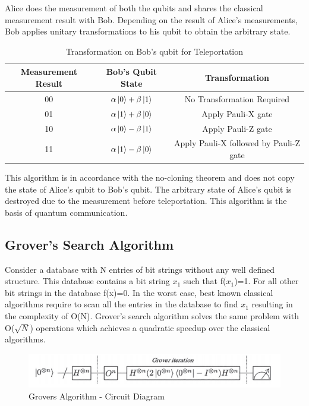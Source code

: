 \documentclass[english,a4paper,11pt,oneside,onecolumn]{book}
\begin{document}
Alice does the measurement of both the qubits and shares the classical measurement result with Bob. Depending on the result of Alice's measurements, Bob applies unitary transformations to his qubit to obtain the arbitrary state.

\begin{table}[!h]
\begin{center}
\begin{tabular}{|c|c|c|}
\hline
\textbf{Measurement Result} & \textbf{Bob's Qubit State} & \textbf{Transformation} \\
\hline
00 & \(\alpha\ket{0}+\beta\ket{1}\) & No Transformation Required\\
\hline
01 & \(\alpha\ket{1}+\beta\ket{0}\) & Apply Pauli-X gate \\
\hline
10 & \(\alpha\ket{0}-\beta\ket{1}\) & Apply Pauli-Z gate \\
\hline
11 & \(\alpha\ket{1}-\beta\ket{0}\) & Apply Pauli-X followed by Pauli-Z gate\\
\hline
\end{tabular}
\end{center}
\caption{Transformation on Bob's qubit for Teleportation} 
\label{tab:qTelePort}
\end{table}

This algorithm is in accordance with the no-cloning theorem and does not copy the state of Alice's qubit to Bob's qubit. The arbitrary state of Alice's qubit is destroyed due to the measurement before teleportation. This algorithm is the basis of quantum communication.

\subsection{Grover's Search Algorithm}
\label{sec:groverAlgo}
Consider a database with N entries of bit strings without any well defined structure. This database contains a bit string \(x_1\) such that f(\(x_1\))=1. For all other bit strings in the database f(x)=0. In the worst case, best known classical algorithms require to scan all the entries in the database to find \(x_1\) resulting in the complexity of O(N). Grover's search algorithm solves the same problem with O(\(\sqrt{N}\)) operations which achieves a quadratic speedup over the classical algorithms.\\

\begin{figure}[H]
    \centering
    \includegraphics[scale=0.7]{Images/GroversCircuit.png}
    \caption{Grovers Algorithm - Circuit Diagram}
    \label{fig:groverCircuit}
\end{figure}
\end{document}
